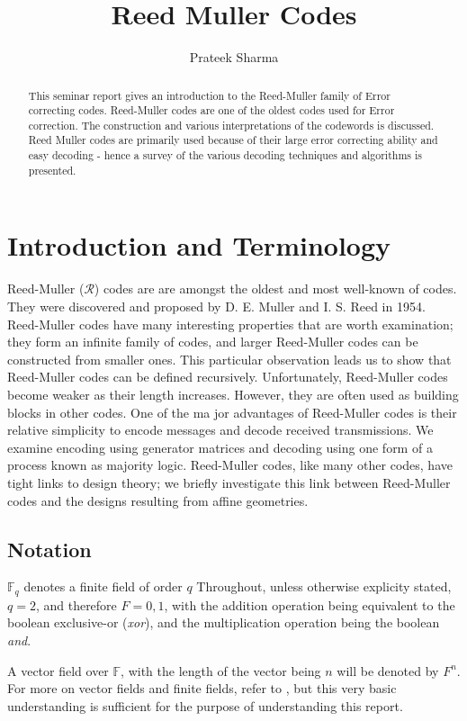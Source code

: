 \documentclass{article}
\title{Reed Muller Codes}
\author{Prateek Sharma}
\newcommand{\F}{\ensuremath{\mathbb{F}}}
\begin{document}
\maketitle

\begin{abstract} 
This seminar report gives an introduction to the Reed-Muller family of Error correcting codes. Reed-Muller codes are one of the oldest codes used for Error correction. The construction and various interpretations of the codewords is discussed. Reed Muller codes are primarily used because of their large error correcting ability and easy decoding - hence a survey of the various decoding techniques and algorithms is presented.
\end{abstract}


\section {Introduction and Terminology}
Reed-Muller ($\mathcal{R}$) codes are are amongst the oldest and most well-known of codes. They were discovered and proposed by D. E. Muller and I. S. Reed in 1954. 
Reed-Muller codes have many interesting properties that are worth examination; they 
form an inﬁnite family of codes, and larger Reed-Muller codes can be constructed from 
smaller ones. This particular observation leads us to show that Reed-Muller codes can be 
deﬁned recursively. 
Unfortunately, Reed-Muller codes become weaker as their length increases. However, 
they are often used as building blocks in other codes. 
One of the ma jor advantages of Reed-Muller codes is their relative simplicity to encode 
messages and decode received transmissions. We examine encoding using generator matrices 
and decoding using one form of a process known as majority logic. 
Reed-Muller codes, like many other codes, have tight links to design theory; we brieﬂy 
investigate this link between Reed-Muller codes and the designs resulting from affine geometries. 

\subsection{Notation}
$\F _q$ denotes a finite field of order $q$
Throughout, unless otherwise explicity stated, $q=2$, and therefore $F={0,1}$, with the addition operation being equivalent to the boolean exclusive-or (\emph{xor}), and the multiplication operation being the boolean \emph{and}.

A vector field over $\F$, with the length of the vector being $n$ will be denoted by $F^n$. For more on vector fields and finite fields, refer to \cite{vectors}, but this very basic understanding is sufficient for the purpose of understanding this report.
\end{document}
